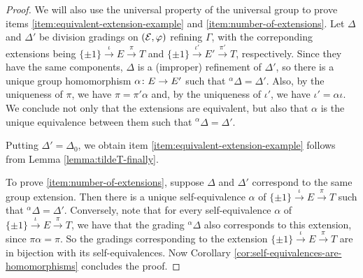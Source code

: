 \begin{proof}
    We will also use the universal property of the universal group to prove items \eqref{item:equivalent-extension-example} and \eqref{item:number-of-extensions}.
    Let $\Delta$ and $\Delta'$ be division gradings on $(\mathcal E, \varphi)$ refining $\Gamma$, with the correponding extensions being $\{ \pm 1 \} \xrightarrow{\iota} E \xrightarrow{\pi} T$ and $\{ \pm 1 \} \xrightarrow{\iota'} E' \xrightarrow{\pi'} T$, respectively. 
    Since they have the same components, $\Delta$ is a (improper) refinement of $\Delta'$, so there is a unique group homomorphism $\alpha\colon E \to E'$ such that ${}^\alpha \Delta = \Delta'$. 
    Also, by the uniqueness of $\pi$, we have $\pi = \pi' \alpha$ and, by the uniqueness of $\iota'$, we have $\iota' = \alpha \iota$. 
    We conclude not only that the extensions are equivalent, but also that $\alpha$ is the unique equivalence between them such that ${}^\alpha \Delta = \Delta'$. 
    
    Putting $\Delta' = \Delta_0$, we obtain item \eqref{item:equivalent-extension-example} follows from Lemma \ref{lemma:tildeT-finally}. 
    
    To prove \eqref{item:number-of-extensions}, 
    suppose $\Delta$ and $\Delta'$ correspond to the same group extension. 
    Then there is a unique self-equivalence $\alpha$ of $\{ \pm 1 \} \xrightarrow{\iota} E \xrightarrow{\pi} T$ such that ${}^\alpha \Delta = \Delta'$. 
    Conversely,
    note that for every self-equivalence $\alpha$ of $\{ \pm 1 \} \xrightarrow{\iota} E \xrightarrow{\pi} T$, we have that the grading ${}^\alpha \Delta$ also corresponds to this extension, since $\pi\alpha = \pi$. 
    So the gradings corresponding to the extension $\{ \pm 1 \} \xrightarrow{\iota} E \xrightarrow{\pi} T$ are in bijection with its self-equivalences. 
    Now Corollary \ref{cor:self-equivalences-are-homomorphisms} concludes the proof.
    
    
    
    

\end{proof}
